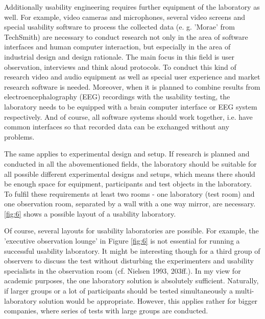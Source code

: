 \documentclass[output=paper]{langsci/langscibook}
\begin{document}
Additionally usability engineering requires further equipment of the laboratory as well. For example, video cameras and microphones, several video screens and special usability software to process the collected data (e. g. 'Morae' from TechSmith) are necessary to conduct research not only in the area of software interfaces and human computer interaction, but especially in the area of industrial design and design rationale. The main focus in this field is user observation, interviews and think aloud protocols. To conduct this kind of research video and audio equipment as well as special user experience and market research software is needed. Moreover, when it is planned to combine results from electroencephalography (EEG) recordings with the usability testing, the laboratory needs to be equipped with a brain computer interface or EEG system respectively. And of course, all software systems should work together, i.e. have common interfaces so that recorded data can be exchanged without any problems.



The same applies to experimental design and setup. If research is planned and conducted in all the abovementioned fields, the laboratory should be suitable for all possible different experimental designs and setups, which means there should be enough space for equipment, participants and test objects in the laboratory. To fulfil these requirements at least two rooms - one laboratory (test room) and one observation room, separated by a wall with a one way mirror, are necessary. \ref{fig:6} shows a possible layout of a usability laboratory.



Of course, several layouts for usability laboratories are possible. For example, the 'executive observation lounge' in Figure \ref{fig:6} is not essential for running a successful usability laboratory. It might be interesting though for a third group of observers to discuss the test without disturbing the experimenters and usability specialists in the observation room (cf. Nielsen 1993, 203ff.). In my view for academic purposes, the one laboratory solution is absolutely sufficient. Naturally, if larger groups or a lot of participants should be tested simultaneously a multi-laboratory solution would be appropriate. However, this applies rather for bigger companies, where series of tests with large groups are conducted.
\end{document}
